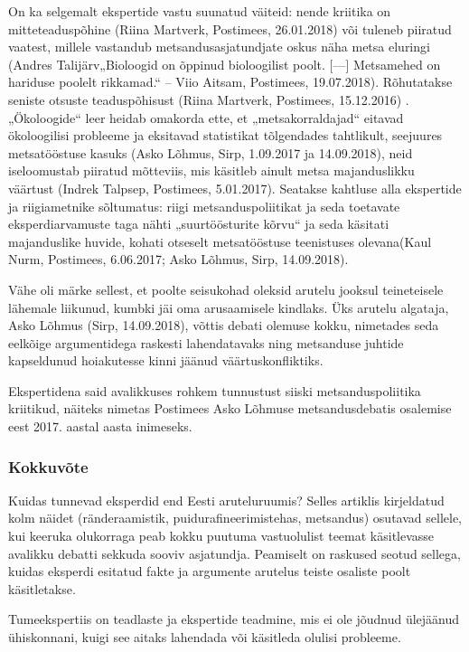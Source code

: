 \documentclass[estonian,]{article}
\begin{document}
On ka selgemalt ekspertide vastu suunatud väiteid: nende kriitika on mitteteaduspõhine (Riina Martverk, Postimees, 26.01.2018) või tuleneb piiratud vaatest, millele vastandub metsandusasjatundjate oskus näha metsa eluringi (Andres Talijärv„Bioloogid on õppinud bioloogilist poolt. {[}---{]} Metsamehed on hariduse poolelt rikkamad.`` -- Viio Aitsam, Postimees, 19.07.2018). Rõhutatakse seniste otsuste teaduspõhisust (Riina Martverk, Postimees, 15.12.2016) . „Ökoloogide`` leer heidab omakorda ette, et „metsakorraldajad`` eitavad ökoloogilisi probleeme ja eksitavad statistikat tõlgendades tahtlikult, seejuures metsatööstuse kasuks (Asko Lõhmus, Sirp, 1.09.2017 ja 14.09.2018), neid iseloomustab piiratud mõtteviis, mis käsitleb ainult metsa majanduslikku väärtust (Indrek Talpsep, Postimees, 5.01.2017). Seatakse kahtluse alla ekspertide ja riigiametnike sõltumatus: riigi metsanduspoliitikat ja seda toetavate eksperdiarvamuste taga nähti „suurtöösturite kõrvu`` ja seda käsitati majanduslike huvide, kohati otseselt metsatööstuse teenistuses olevana(Kaul Nurm, Postimees, 6.06.2017; Asko Lõhmus, Sirp, 14.09.2018).

Vähe oli märke sellest, et poolte seisukohad oleksid arutelu jooksul teineteisele lähemale liikunud, kumbki jäi oma arusaamisele kindlaks. Üks arutelu algataja, Asko Lõhmus (Sirp, 14.09.2018), võttis debati olemuse kokku, nimetades seda eelkõige argumentidega raskesti lahendatavaks ning metsanduse juhtide kapseldunud hoiakutesse kinni jäänud väärtuskonfliktiks.

Ekspertidena said avalikkuses rohkem tunnustust siiski metsanduspoliitika kriitikud, näiteks nimetas Postimees Asko Lõhmuse metsandusdebatis osalemise eest 2017. aastal aasta inimeseks.

\hypertarget{kokkuvuxf5te-14}{%
\subsubsection*{Kokkuvõte}\label{kokkuvuxf5te-14}}

Kuidas tunnevad eksperdid end Eesti aruteluruumis? Selles artiklis kirjeldatud kolm näidet (ränderaamistik, puidurafineerimistehas, metsandus) osutavad sellele, kui keeruka olukorraga peab kokku puutuma vastuolulist teemat käsitlevasse avalikku debatti sekkuda sooviv asjatundja. Peamiselt on raskused seotud sellega, kuidas eksperdi esitatud fakte ja argumente arutelus teiste osaliste poolt käsitletakse.

\begin{blockquote-left}
Tumeekspertiis on teadlaste ja ekspertide teadmine, mis ei ole jõudnud
ülejäänud ühiskonnani, kuigi see aitaks lahendada või käsitleda olulisi
probleeme.
\end{blockquote-left}
\end{document}
